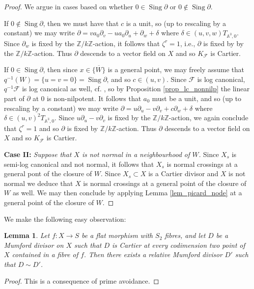 \documentclass[12pt, a4paper]{amsart}
\DeclareMathOperator{\sing}{Sing}
\newtheorem{lemma}[theorem]{Lemma}
\theoremstyle{definition}
\theoremstyle{named}
\begin{document}
\begin{proof}
We argue in cases based on whether $0 \in \sing \partial$ or $0 \not\in \sing \partial$.



If $0 \not\in \sing \partial$, then we must have that $c$ is a unit, so (up to rescaling by a constant) we may write $\partial = va_0\partial_v-ua_0\partial_u+\partial_w+\delta$ where $\delta \in (u, v, w)T_{\mathbb A^3, 0}$. Since $\partial_w$ is fixed by the $\mathbb Z/k\mathbb Z$-action, it follows that $\zeta^r = 1$, i.e., $\partial$
is fixed by by the $\mathbb Z/k\mathbb Z$-action. Thus $\partial$ descends to a vector field on $X$ and so $K_{\mathcal F}$
is Cartier.

If $0 \in \sing \partial$, then 
since $x \in \overline{\{W\}}$ is a general point, we may freely assume that $q^{-1}(W) = \{u = v = 0\} =  \sing \partial$, and so 
$c \in (u, v)$.
Since $\mathcal F$ is log canonical, $q^{-1}\mathcal F$ is log canonical as well, cf. \cite[Lemma 2.20]{SS23}, so by Proposition \ref{prop_lc_nonnilp} the linear part of $\partial$ at $0$ is non-nilpotent.
It follows that $a_0$ must be a unit, and so (up to rescaling by a constant) we may write 
$\partial = u\partial_u-v\partial_v+c\partial_w+\delta$ where $\delta \in (u, v)^2T_{\mathbb A^3, 0}$.
Since $u\partial_u-v\partial_v$ is fixed by the $\mathbb Z/k\mathbb Z$-action, we again conclude that $\zeta^r = 1$
and so
$\partial$
is fixed by $\mathbb Z/k\mathbb Z$-action.
Thus $\partial$ descends to a vector field on $X$
and so $K_{\mathcal F}$ is Cartier.


\medskip
{\bf Case II: }{\it  Suppose that $X$ is not normal 
in a neighbourhood of $W$.}
Since $X_s$ is semi-log canonical and not normal, it follows that $X_s$ is normal crossings at a general pont of the closure of $W$.
Since $X_s \subset X$ is a Cartier divisor and $X$ is not normal 
we deduce that $X$ is normal crossings at a general point of the closure of 
$W$ as well.
We may then conclude by applying Lemma \ref{lem_picard_node} at a general point of the closure of $W$.
\end{proof}


We make the following easy observation:

\begin{lemma}
\label{lem_rel_mumford_crit}
    Let $f\colon X \rightarrow S$ be a flat morphism with $S_2$ fibres, and let $D$ be a Mumford divisor
    on $X$ such that $D$ is Cartier at 
    every codimension two point of $X$ contained in a fibre of $f$.  
    Then there exists a relative Mumford divisor $D'$ such that $D \sim D'$.
\end{lemma}
\begin{proof}
This is a consequence of prime avoidance.
\end{proof}
\end{document}
